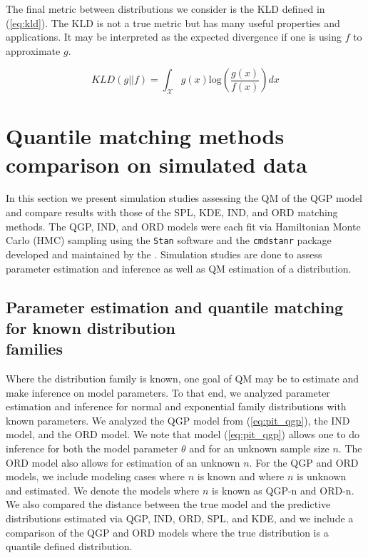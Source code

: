 The final metric between distributions we consider is the KLD defined in 
(\ref{eq:kld}). The KLD is not a true metric but has many useful properties 
and applications. It may be interpreted as the expected divergence if one is 
using $f$ to approximate $g$. 


\begin{equation}
    \label{eq:kld}
    KLD(g || f) = \int_{\mathcal{X}} 
    g(x) \text{log} \left( \frac{g(x)}{f(x)} \right) dx
\end{equation}



\section{Quantile matching methods comparison on simulated data} \label{sec:simulation_analyses}

In this section we present simulation studies assessing the QM of the
QGP model and compare results with those of the SPL, KDE, IND, and ORD matching
methods. The QGP, IND, and ORD models were each fit via Hamiltonian Monte Carlo
(HMC) sampling using the \texttt{Stan} software and the \texttt{cmdstanr}
package developed and maintained by the \cite{stan2024manual}
\cite[]{gabry2022stan}. Simulation studies are done to assess parameter
estimation and inference as well as QM estimation of a distribution.



\subsection{Parameter estimation and quantile matching for known distribution \\families} 

Where the distribution family is known, one goal of QM may be to estimate and 
make inference on model parameters. To that end, we analyzed 
parameter estimation and inference for normal and exponential family 
distributions with known parameters. We analyzed the QGP model from 
(\ref{eq:pit_qgp}), the IND model, and the ORD model. We note that model 
(\ref{eq:pit_qgp}) allows one to do inference for both the model parameter 
$\theta$ and for an unknown sample size $n$. The ORD model also allows for 
estimation of an unknown $n$. For the QGP and ORD models, we include modeling 
cases where $n$ is known and where $n$ is unknown and estimated. We denote the 
models where $n$ is known as QGP-n and ORD-n. We also compared the distance 
between the true model and the predictive distributions estimated via QGP, IND, 
ORD, SPL, and KDE, and we include a comparison of the QGP and ORD models 
where the true distribution is a quantile defined distribution.

